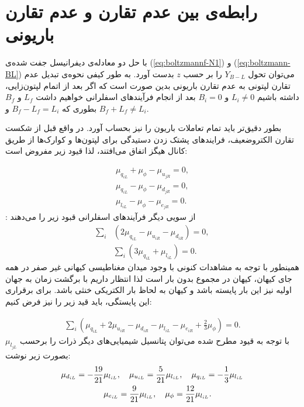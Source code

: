 \documentclass[a4paper]{book}
\begin{document}
\section{رابطه‌ی بین عدم تقارن  و عدم تقارن باریونی}
\label{sec:baryon-asymmetry}
با حل دو معادله‌ی دیفرانیسل جفت شده‌ی (\ref{eq:boltzmannf-N1}) و (\ref{eq:boltzmann-BL}) می‌توان تحول {\footnotesize$Y_{B-L}$} را بر حسب {\footnotesize$z$} بدست آورد.
به طور کیفی نحوه‌ی تبدیل عدم تقارن لپتونی به عدم تقارن باریونی بدین صورت است که اگر بعد از اتمام لپتون‌زایی، داشته باشیم {\footnotesize$L_i\neq0$} و {\footnotesize$B_i=0$} بعد از انجام فرآیند‌های اسفلرانی خواهیم داشت {\footnotesize$L_f$} و {\footnotesize$B_f$} بطوری که {\footnotesize$B_f-L_f=L_i$} و {\footnotesize$B_f+L_f\neq L_i$}.

بطور دقیق‌تر باید تمام تعاملات باریون را نیز بحساب آورد.
در واقع قبل از شکست تقارن الکتروضعیف، فرایند‌های پشتک زدن دستیدگی برای لپتون‌ها و کوارک‌ها از طریق کانال هیگز اتفاق می‌افتند، لذا قیود زیر مفروض است:
\par
\vspace{-0.5cm}
{\footnotesize\begin{align}
	\mu_{q_{iL}}+\mu_{\phi}-\mu_{u_{jR}}=0,\\
	\mu_{q_{iL}}-\mu_{\phi}-\mu_{d_{jR}}=0,\\
	\mu_{l_{iL}}-\mu_{\phi}-\mu_{e_{jR}}=0.
\end{align}}
از سویی دیگر فرآیند‌های اسفلرانی قبود زیر را می‌دهند \cite{Schwartz:2014sze}:
{\footnotesize\begin{align}
	\sum_i &\left(2 \mu_{q_{iL}}-\mu_{u_{iR}}-\mu_{d_{iR}}\right) = 0,\\
	&\sum_i \left(3 \mu_{q_{iL}} + \mu_{l_{iL}}\right) = 0.
\end{align}}
همینطور با توجه به مشاهدات کنونی با وجود میدان مغناطیسی کیهانی غیر صفر در همه جای کیهان، کیهان در مجموع بدون بار است لذا انتظار داریم با برگشت زمان به جهان اولیه نیز این بار پایسته باشد و کیهان به لحاظ بار الکتریکی خنثی باشد. برای برقراری این پایستگی، باید قید زیر را نیز فرض کنیم:
\par
\vspace{-0.5cm}
{\footnotesize\begin{align}
	\sum_{i} \left(\mu_{q_{iL}}+2\mu_{u_{iR}}-\mu_{d_{iR}}-\mu_{l_{iL}}-\mu_{e_{iR}}+\frac{2}{3}\mu_{\phi}\right)=0.
\end{align}}
با توجه به قیود مطرح شده می‌توان پتانسیل شیمیایی‌های دیگر ذرات را برحسب {\footnotesize$\mu_{l_{jL}}$} بصورت زیر نوشت:
{\footnotesize\begin{align}
	\mu_{d_{iL}}=-\frac{19}{21} &\mu_{l_{iL}}, \quad \mu_{u_{iL}}=\frac{5}{21} \mu_{l_{iL}},\quad \mu_{q_{iL}}=-\frac{1}{3}\mu_{l_{iL}}\notag\\
	&\mu_{e_{iL}}=\frac{9}{21} \mu_{l_{iL}}, \quad \mu_{\phi}=\frac{12}{21} \mu_{l_{iL}}.
\end{align}}
\end{document}

